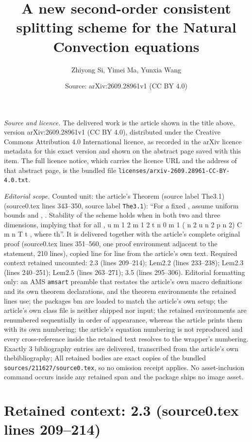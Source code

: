 \documentclass[10pt,a4paper]{amsart}
\title[A new second-order consistent splitting scheme for the Natural Convection equations]{A new second-order consistent splitting scheme for the Natural Convection equations}
\author{Zhiyong Si, Yimei Ma, Yunxia Wang}
\date{Source: arXiv:2609.28961v1 (CC BY 4.0)}
\theoremstyle{thmm}
\begin{document}
\maketitle

\noindent\emph{Source and licence.} The delivered work is the article shown in the title above, version arXiv:2609.28961v1 (CC BY 4.0), distributed under the Creative Commons Attribution 4.0 International licence, as recorded in the arXiv licence metadata for this exact version and shown on the abstract page saved with this item. The full licence notice, which carries the licence URL and the address of that abstract page, is the bundled file \texttt{licenses/arxiv-2609.28961-CC-BY-4.0.txt}.
\par\smallskip

\noindent\textit{Editorial scope.} Counted unit: the article's Theorem (source label The3.1) (source0.tex lines 343--350, source label \texttt{The3.1}): ``For a fixed , assume uniform bounds and , . Stability of the scheme holds when in both two and three dimensions, implying that for all , u m 1 2 m 1 2 t n 0 m 1 ( n 2 u n 2 p n 2) C m n T t , where th''. It is delivered together with the article's complete original proof (source0.tex lines 351--560, one proof environment adjacent to the statement, 210 lines), copied line for line from the article's own text. Required context retained uncounted: 2.3 (lines 209--214); Lem2.2 (lines 233--238); Lem2.3 (lines 240--251); Lem2.5 (lines 263--271); 3.5 (lines 295--306). Editorial formatting only: an AMS \texttt{amsart} preamble that restates the article's own macro definitions and its own theorem declarations, and the theorem environments the retained lines use; the packages bm are loaded to match the article's own setup; the article's own class file is neither shipped nor input; the retained environments are renumbered sequentially in order of appearance, whereas the article prints them with its own numbering; the article's equation numbering is not reproduced and every cross-reference inside the retained text resolves to the wrapper's numbering. Exactly 3 bibliography entries are delivered, transcribed from the article's own thebibliography; All retained bodies are exact copies of the bundled \texttt{sources/211627/source0.tex}, so no omission receipt applies. No asset-inclusion command occurs inside any retained span and the package ships no image asset.


\section*{Retained context: 2.3 (source0.tex lines 209--214)}
\end{document}
